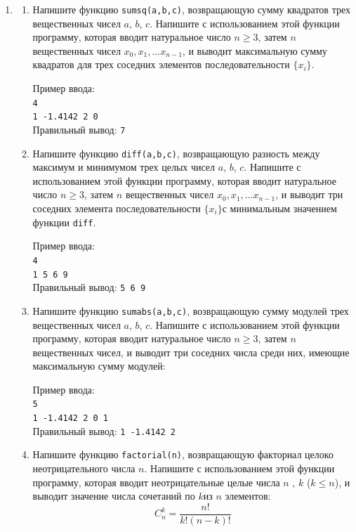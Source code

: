 \documentclass{article}
\newcommand{\textex}[1]{\texttt{\color{ForestGreen}#1}}
\begin{document}
\begin{enumerate}[label={}, leftmargin=0pt, itemindent=0pt]

\item

\begin{enumerate}[label=\arabic{enumi}.\arabic*.] %
\item
Напишите функцию \texttt{sumsq(a,b,c)}, возвращающую сумму квадратов трех вещественных чисел $a$, $b$, $c$. Напишите с использованием этой функции программу, которая вводит натуральное число $n\geqslant 3$, затем $n$ вещественных чисел $x_0, x_1, \ldots x_{n-1}$, и выводит максимальную сумму квадратов для трех соседних элементов последовательности $\{x_i\}$.

\noindent Пример ввода: \\
\textex{4\\
1 -1.4142 2 0}\\
Правильный вывод: \textex{7}

\item
Напишите функцию \texttt{diff(a,b,c)}, возвращающую разность между максимум и минимумом трех целых чисел $a$, $b$, $c$. Напишите с использованием этой функции программу, которая вводит натуральное число $n\geqslant 3$, затем $n$ вещественных чисел $x_0, x_1, \ldots x_{n-1}$, и выводит три соседних элемента последовательности $\{x_i\}$с минимальным значением функции \texttt{diff}.

\noindent Пример ввода: \\
\textex{4\\
1 5 6 9}\\
Правильный вывод: \textex{5 6 9}

\item
Напишите функцию \texttt{sumabs(a,b,c)}, возвращающую сумму модулей трех вещественных чисел $a$, $b$, $c$. Напишите с использованием этой функции программу, которая вводит натуральное число $n\geqslant 3$, затем $n$ вещественных чисел, и выводит три соседних числа среди них, имеющие максимальную сумму модулей:

\noindent Пример ввода: \\
\textex{5\\
1 -1.4142 2 0 1}\\
Правильный вывод: \textex{1 -1.4142 2}

\item
Напишите функцию \texttt{factorial(n)}, возвращающую факториал целоко неотрицательного числа $n$. Напишите с использованием этой функции программу, которая вводит неотрицательные целые числа $n$ , $k$  ($k\leqslant n$), и выводит значение числа сочетаний по $k$из $n$ элементов: $$C_n^k = \frac{n!}{k!(n-k)!}$$


\end{enumerate}
\end{enumerate}
\end{document}
